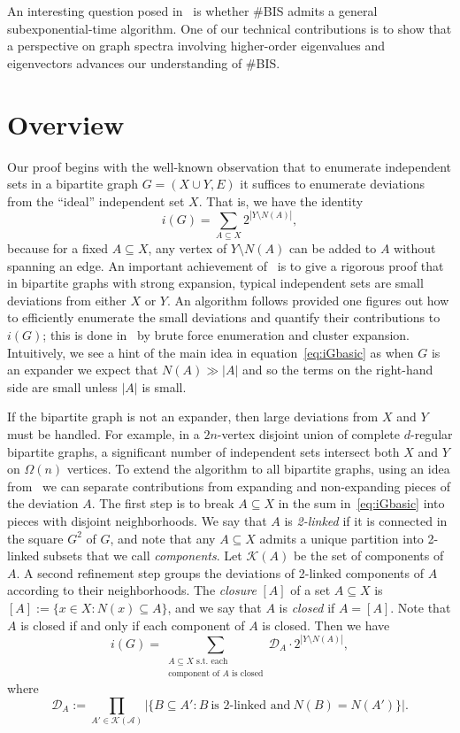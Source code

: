 \documentclass[11pt,letterpaper]{amsart}
\theoremstyle{definition}
\renewcommand{\subset}{\subseteq}
\begin{document}
An interesting question posed in~\cite{JPP22} is whether \#BIS admits a general subexponential-time algorithm. 
One of our technical contributions is to show that a perspective on graph spectra involving higher-order eigenvalues and eigenvectors advances our understanding of \#BIS.


\section{Overview}

Our proof begins with the well-known observation that to enumerate independent sets in a bipartite graph $G=(X\cup Y, E)$ it suffices to enumerate deviations from the ``ideal'' independent set $X$. 
That is, we have the identity
\begin{equation}\label{eq:iGbasic}
    i(G) = \sum_{A\subset X} 2^{|Y\setminus N(A)|},
\end{equation}
because for a fixed $A\subset X$, any vertex of $Y\setminus N(A)$ can be added to $A$ without spanning an edge.
An important achievement of~\cite{JKP19b} is to give a rigorous proof that in bipartite graphs with strong expansion, typical independent sets are small deviations from either $X$ or $Y$. An algorithm follows provided one figures out how to efficiently enumerate the small deviations and quantify their contributions to $i(G)$; this is done in~\cite{JKP19b} by brute force enumeration and cluster expansion. 
Intuitively, we see a hint of the main idea in equation~\eqref{eq:iGbasic} as when $G$ is an expander we expect that $N(A) \gg |A|$ and so the terms on the right-hand side are small unless $|A|$ is small. 

If the bipartite graph is not an expander, then large deviations from $X$ and $Y$ must be handled. For example, in a $2n$-vertex disjoint union of complete $d$-regular bipartite graphs, a significant number of independent sets intersect both $X$ and $Y$ on $\Omega(n)$ vertices. 
To extend the algorithm to all bipartite graphs, using an idea from~\cite{JPP22} we can separate contributions from expanding and non-expanding pieces of the deviation $A$.
The first step is to break $A\subset X$ in the sum in~\eqref{eq:iGbasic} into pieces with disjoint neighborhoods. 
We say that $A$ is \emph{2-linked} if it is connected in the square $G^2$ of $G$, and note that any $A\subset X$ admits a unique partition into 2-linked subsets that we call \emph{components}. Let $\mathcal{K}(A)$ be the set of components of $A$.
A second refinement step groups the deviations of 2-linked components of $A$ according to their neighborhoods. The \emph{closure} $[A]$ of a set $A\subset X$ is $[A] := \{x\in X : N(x)\subset A\}$, and we say that $A$ is \emph{closed} if $A=[A]$. 
Note that $A$ is closed if and only if each component of $A$ is closed.
Then we have 
\begin{equation}\label{eq:iGclosed}
    i(G) = \sum_{\substack{A\subset X\text{ s.t.\ each}\\\text{component of $A$ is closed}}} \mathcal{D}_A\cdot 2^{|Y\setminus N(A)|},
\end{equation}
where 
\[ \mathcal{D}_A := \prod_{A'\in \mathcal{K(A)}}\bigl| \{ B\subset A' : B~\text{is 2-linked and}~N(B)=N(A')\}\bigr| .\]
\end{document}
